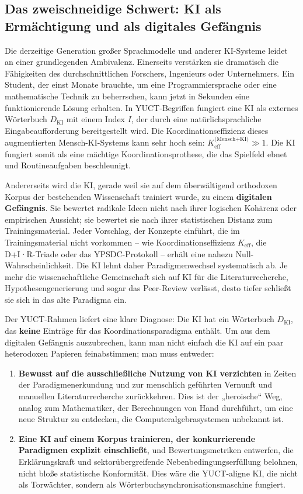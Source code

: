 \documentclass[12pt,a4paper]{article}
\begin{document}
	\subsection{Das zweischneidige Schwert: KI als Ermächtigung und als digitales Gefängnis}
	
	Die derzeitige Generation großer Sprachmodelle und anderer KI-Systeme leidet an einer grundlegenden Ambivalenz. Einerseits verstärken sie dramatisch die Fähigkeiten des durchschnittlichen Forschers, Ingenieurs oder Unternehmers. Ein Student, der einst Monate brauchte, um eine Programmiersprache oder eine mathematische Technik zu beherrschen, kann jetzt in Sekunden eine funktionierende Lösung erhalten. In YUCT-Begriffen fungiert eine KI als externes Wörterbuch \(D_{\text{KI}}\) mit einem Index \(I\), der durch eine natürlichsprachliche Eingabeaufforderung bereitgestellt wird. Die Koordinationseffizienz dieses augmentierten Mensch-KI-Systems kann sehr hoch sein: \(K_{\mathrm{eff}}^{\text{(Mensch+KI)}} \gg 1\). Die KI fungiert somit als eine mächtige Koordinationsprothese, die das Spielfeld ebnet und Routineaufgaben beschleunigt.
	
	Andererseits wird die KI, gerade weil sie auf dem überwältigend orthodoxen Korpus der bestehenden Wissenschaft trainiert wurde, zu einem \textbf{digitalen Gefängnis}. Sie bewertet radikale Ideen nicht nach ihrer logischen Kohärenz oder empirischen Aussicht; sie bewertet sie nach ihrer statistischen Distanz zum Trainingsmaterial. Jeder Vorschlag, der Konzepte einführt, die im Trainingsmaterial nicht vorkommen – wie Koordinationseffizienz \(K_{\mathrm{eff}}\), die D+I·R-Triade oder das YPSDC-Protokoll – erhält eine nahezu Null-Wahrscheinlichkeit. Die KI lehnt daher Paradigmenwechsel systematisch ab. Je mehr die wissenschaftliche Gemeinschaft sich auf KI für die Literaturrecherche, Hypothesengenerierung und sogar das Peer-Review verlässt, desto tiefer schließt sie sich in das alte Paradigma ein.
	
	Der YUCT-Rahmen liefert eine klare Diagnose: Die KI hat ein Wörterbuch \(D_{\text{KI}}\), das \textbf{keine} Einträge für das Koordinationsparadigma enthält. Um aus dem digitalen Gefängnis auszubrechen, kann man nicht einfach die KI auf ein paar heterodoxen Papieren feinabstimmen; man muss entweder:
	
	\begin{enumerate}
		\item \textbf{Bewusst auf die ausschließliche Nutzung von KI verzichten} in Zeiten der Paradigmenerkundung und zur menschlich geführten Vernunft und manuellen Literaturrecherche zurückkehren. Dies ist der „heroische“ Weg, analog zum Mathematiker, der Berechnungen von Hand durchführt, um eine neue Struktur zu entdecken, die Computeralgebrasystemen unbekannt ist.
		\item \textbf{Eine KI auf einem Korpus trainieren, der konkurrierende Paradigmen explizit einschließt}, und Bewertungsmetriken entwerfen, die Erklärungskraft und sektorübergreifende Nebenbedingungserfüllung belohnen, nicht bloße statistische Konformität. Dies wäre die YUCT-aligne KI, die nicht als Torwächter, sondern als Wörterbuchsynchronisationsmaschine fungiert.
	\end{enumerate}
	
\end{document}
